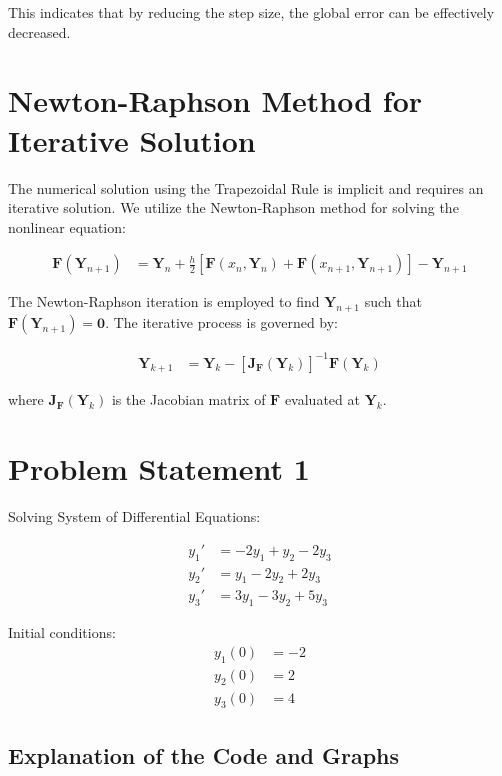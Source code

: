 \documentclass{article}
\begin{document}
This indicates that by reducing the step size, the global error can be effectively decreased.

\section*{Newton-Raphson Method for Iterative Solution}

The numerical solution using the Trapezoidal Rule is implicit and requires an iterative solution. We utilize the Newton-Raphson method for solving the nonlinear equation:

\begin{align}
    \mathbf{F}(\mathbf{Y}_{n+1}) &= \mathbf{Y}_{n} + \frac{h}{2}[\mathbf{F}(x_{n}, \mathbf{Y}_{n}) + \mathbf{F}(x_{n+1}, \mathbf{Y}_{n+1})] - \mathbf{Y}_{n+1}
\end{align}

The Newton-Raphson iteration is employed to find $\mathbf{Y}_{n+1}$ such that $\mathbf{F}(\mathbf{Y}_{n+1}) = \mathbf{0}$. The iterative process is governed by:

\begin{align}
    \mathbf{Y}_{k+1} &= \mathbf{Y}_{k} - [\mathbf{J_F}(\mathbf{Y}_{k})]^{-1} \mathbf{F}(\mathbf{Y}_{k})
\end{align}

where $\mathbf{J_F}(\mathbf{Y}_{k})$ is the Jacobian matrix of $\mathbf{F}$ evaluated at $\mathbf{Y}_{k}$.


\section*{Problem Statement 1}
Solving System of Differential Equations:

\begin{align*}
    y_1' &= -2y_1 + y_2 - 2y_3\\
    y_2' &= y_1 - 2y_2 + 2y_3 \\
    y_3' &= 3y_1 - 3y_2 + 5y_3
\end{align*}

Initial conditions:
\begin{align*}
    y_1(0) &= -2 \\
    y_2(0) &= 2 \\
    y_3(0) &= 4
\end{align*}
\subsection*{Explanation of the Code and Graphs}
\end{document}
